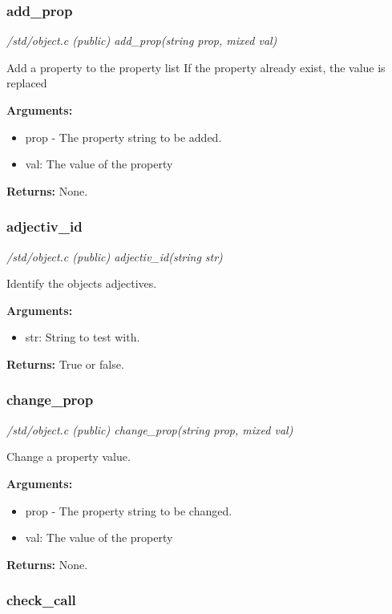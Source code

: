 \subsubsection{add\_prop}

{\em /std/object.c (public) add\_prop(string prop, mixed val)}

Add a property to the property list
If the property already exist, the value is replaced

{\bf Arguments:}
\begin{itemize}
\item     prop - The property string to be added.
\item val: The value of the property
\end{itemize}

{\bf Returns:}        None.


\subsubsection{adjectiv\_id}

{\em /std/object.c (public) adjectiv\_id(string str)}

Identify the objects adjectives.

{\bf Arguments:}
\begin{itemize}
\item     str: String to test with.
\end{itemize}

{\bf Returns:}    True or false.


\subsubsection{change\_prop}

{\em /std/object.c (public) change\_prop(string prop, mixed val)}

Change a property value.

{\bf Arguments:}
\begin{itemize}
\item     prop - The property string to be changed.
\item val: The value of the property
\end{itemize}

{\bf Returns:}        None.


\subsubsection{check\_call}

